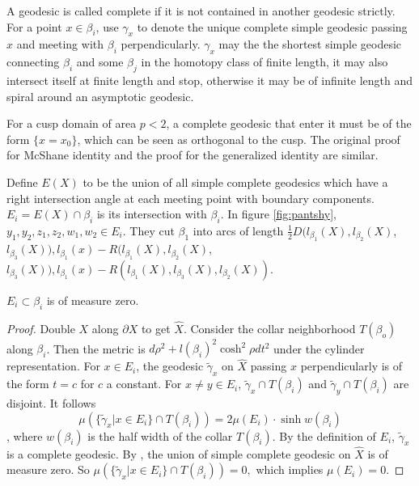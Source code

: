 A geodesic is called complete if it is not contained in another geodesic strictly. For a point $x\in \beta_i$, use $\gamma_x$ to denote the unique complete simple  geodesic passing $x$ and meeting with $\beta_i$ perpendicularly. $\gamma_x$ may the the shortest simple geodesic connecting $\beta_i$ and some $\beta_j$ in the homotopy class of finite length, it may also intersect itself at finite length and stop, otherwise it may be of infinite length and spiral around an asymptotic  geodesic.  

\begin{remark}
For a cusp domain of area $p<2$, a complete geodesic that enter it must be of the form $\{x=x_0\}$, which can be seen as orthogonal to the cusp. The original proof for McShane identity and the proof for the generalized identity are similar. 
\end{remark}


Define $E(X)$ to be the union of all simple complete geodesics which have a right intersection angle  at each meeting point with boundary components. $E_i=E(X)\cap \beta_i$ is its intersection with $\beta_i$. In figure \ref{fig:pantshy}, $y_1,y_2,z_1,z_2,w_1,w_2\in E_i$. They cut $\beta_1$ into arcs of length $\frac{1}{2}D(l_{\beta_1}(X),l_{\beta_2}(X)$, $l_{\beta_3}(X)),l_{\beta_1}(x)-R(l_{\beta_1}(X),l_{\beta_2}(X)$, $l_{\beta_3}(X)),l_{\beta_1}(x)-R(l_{\beta_1}(X),l_{\beta_3}(X),l_{\beta_2}(X))$. 
\begin{lemma}\label{measurezero}
$E_i\subset \beta_i$ is of measure zero.
\end{lemma}

\begin{proof}
Double $X$ along $\partial X$ to get $\hat{X}$. Consider the collar neighborhood $T(\beta_o)$ along $\beta_i$. Then the metric is $d\rho^2+l(\beta_i)^2\cosh^2\rho dt^2$ under the cylinder representation. For $x\in E_i$, the geodesic $\tilde{\gamma}_x$ on $\hat{X}$ passing $x$ perpendicularly is of the form $t=c$ for $c$ a constant.  For $x\neq y\in E_i$,  $\tilde{\gamma}_x\cap T(\beta_i)$ and $\tilde{\gamma}_y\cap T(\beta_i)$ are disjoint.
It follows $$\mu(\{\tilde{\gamma}_x|x\in E_i\}\cap T(\beta_i))=2 \mu(E_i)\cdot \sinh w(\beta_i)$$, where $w(\beta_i)$ is the half width of the collar $T(\beta_i)$.
By the definition of $E_i$, $\tilde{\gamma}_x$ is a  complete geodesic. By \cite{BIRMAN1985217}, the union of simple complete geodesic on $\hat{X}$ is of measure zero.
So $\mu(\{\tilde{\gamma}_x|x\in E_i\}\cap T(\beta_i))=0,$ which  implies $\mu(E_i)=0.$
\end{proof}



